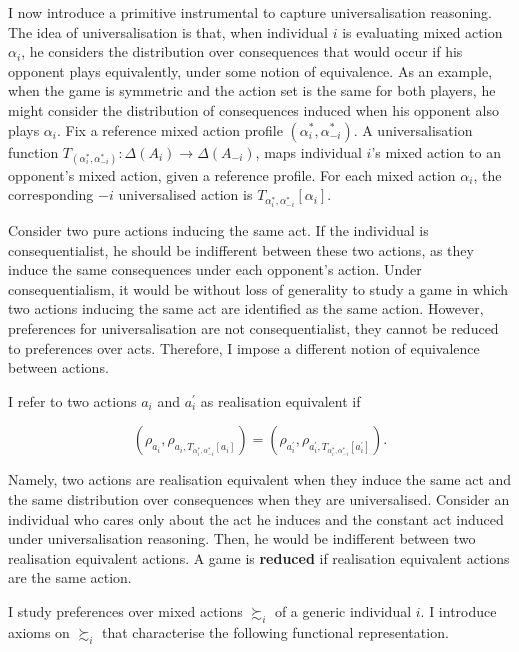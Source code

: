 I now introduce a primitive instrumental to capture universalisation reasoning. The idea of universalisation is that, when individual \( i \) is evaluating mixed action \( \alpha_{i} \), he considers the distribution over consequences that would occur if his opponent plays equivalently, under some notion of equivalence. As an example, when the game is symmetric and the action set is the same for both players, he might consider the distribution of consequences induced when his opponent also plays \( \alpha_{i} \). Fix a reference mixed action profile \( ( \alpha^{*}_{i}, \alpha_{-i}^{*} ) \). A universalisation function \( T_{( \alpha^{*}_{i}, \alpha_{-i}^{*} )} \colon \Delta (A_{i} ) \rightarrow \Delta (A_{-i} ) \), maps individual \( i \)'s mixed action to an opponent's mixed action, given a reference profile. For each mixed action \( \alpha_i \), the corresponding \( -i \) universalised action is \( T_{\alpha^{*}_i, \alpha^{*}_{-i}} [\alpha_i] \).

Consider two pure actions inducing the same act. If the individual is consequentialist, he should be indifferent between these two actions, as they induce the same consequences under each opponent's action. Under consequentialism, it would be without loss of generality to study a game in which two actions inducing the same act are identified as the same action. However, preferences for universalisation are not consequentialist, they cannot be reduced to preferences over acts. Therefore, I impose a different notion of equivalence between actions.

I refer to two actions \(a_i\) and \(a_i^{\prime}\) as realisation equivalent if

\[ \left(\rho_{a_i}, \rho_{a_i,T_{\alpha^{*}_i, \alpha^{*}_{-i}} [a_i]}\right) = \left(\rho_{a_i^{\prime}}, \rho_{a_i^{\prime},T_{\alpha^{*}_i, \alpha^{*}_{-i}} [a_i^{\prime}]}\right) .\]

Namely, two actions are realisation equivalent when they induce the same act and the same distribution over consequences when they are universalised. Consider an individual who cares only about the act he induces and the constant act induced under universalisation reasoning. Then, he would be indifferent between two realisation equivalent actions. A game is \textbf{reduced} if realisation equivalent actions are the same action.

I study preferences over mixed actions \( \succsim_i \) of a generic individual \( i \). I introduce axioms on \( \succsim_i \) that characterise the following functional representation.


